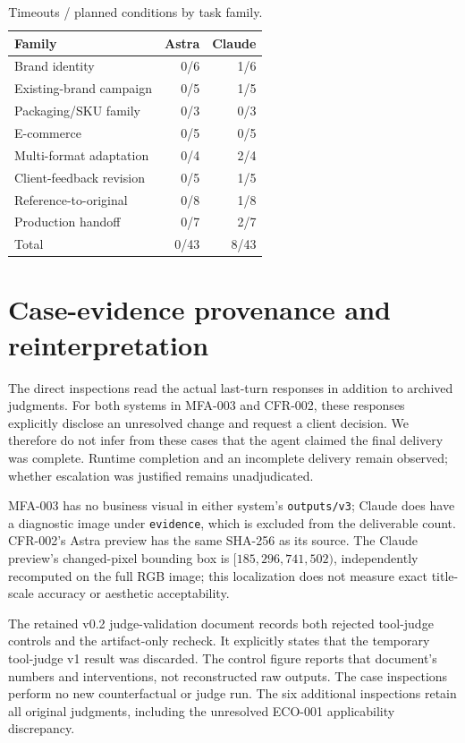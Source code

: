 \begin{table}[ht]
\centering\small
\caption{Timeouts / planned conditions by task family.}
\label{tab:category}
\begin{tabularx}{\linewidth}{@{}Yrr@{}}
\toprule Family & Astra & Claude\\\midrule
Brand identity & 0/6 & 1/6\\
Existing-brand campaign & 0/5 & 1/5\\
Packaging/SKU family & 0/3 & 0/3\\
E-commerce & 0/5 & 0/5\\
Multi-format adaptation & 0/4 & 2/4\\
Client-feedback revision & 0/5 & 1/5\\
Reference-to-original & 0/8 & 1/8\\
Production handoff & 0/7 & 2/7\\\midrule
Total & 0/43 & 8/43\\\bottomrule
\end{tabularx}
\end{table}

\section{Case-evidence provenance and reinterpretation}
The direct inspections read the actual last-turn responses in addition to archived judgments. For both systems in MFA-003 and CFR-002, these responses explicitly disclose an unresolved change and request a client decision. We therefore do not infer from these cases that the agent claimed the final delivery was complete. Runtime completion and an incomplete delivery remain observed; whether escalation was justified remains unadjudicated.

MFA-003 has no business visual in either system's \texttt{outputs/v3}; Claude does have a diagnostic image under \texttt{evidence}, which is excluded from the deliverable count. CFR-002's Astra preview has the same SHA-256 as its source. The Claude preview's changed-pixel bounding box is $[185,296,741,502)$, independently recomputed on the full RGB image; this localization does not measure exact title-scale accuracy or aesthetic acceptability.

The retained v0.2 judge-validation document records both rejected tool-judge controls and the artifact-only recheck. It explicitly states that the temporary tool-judge v1 result was discarded. The control figure reports that document's numbers and interventions, not reconstructed raw outputs. The case inspections perform no new counterfactual or judge run. The six additional inspections retain all original judgments, including the unresolved ECO-001 applicability discrepancy.

